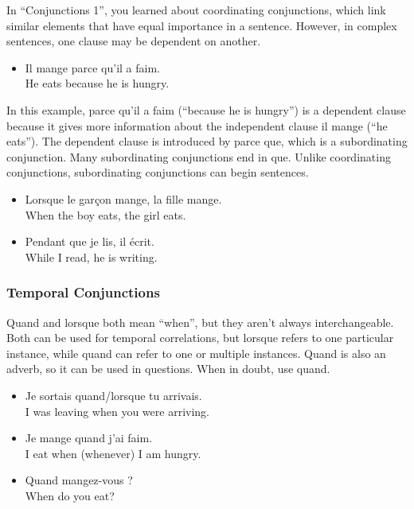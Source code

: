 In ``Conjunctions 1'', you learned about coordinating conjunctions, which link similar elements that have equal importance in a sentence. However, in complex sentences, one clause may be dependent on another.

\begin{itemize}
  \item  Il mange parce qu'il a faim. \\ He eats because he is hungry.
\end{itemize}

In this example, parce qu'il a faim (``because he is hungry'') is a dependent clause because it gives more information about the independent clause il mange (``he eats''). The dependent clause is introduced by parce que, which is a subordinating conjunction. Many subordinating conjunctions end in que.  Unlike coordinating conjunctions, subordinating conjunctions can begin sentences.

\begin{itemize}
  \item  Lorsque le gar{\c c}on mange, la fille mange. \\ When the boy eats, the girl eats.
  \item  Pendant que je lis, il {\'e}crit. \\ While I read, he is writing.
\end{itemize}

\subsubsection{Temporal Conjunctions}

Quand and lorsque both mean ``when'', but they aren't always interchangeable. Both can be used for temporal correlations, but lorsque refers to one particular instance, while quand can refer to one or multiple instances. Quand is also an adverb, so it can be used in questions. When in doubt, use quand.

\begin{itemize}
  \item  Je sortais quand/lorsque tu arrivais. \\ I was leaving when you were arriving.
  \item  Je mange quand j'ai faim. \\ I eat when (whenever) I am hungry.
  \item  Quand mangez-vous ? \\ When do you eat?
\end{itemize}

